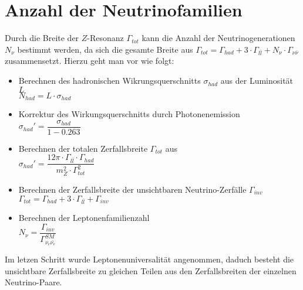 \documentclass{include/thesisclass3}
\newcommand{\cc}{\cdot}
\begin{document}
\section{Anzahl der Neutrinofamilien}
Durch die Breite der $Z$-Resonanz $\Gamma_{tot}$ kann die Anzahl der Neutrinogenerationen $N_\nu$ bestimmt werden, da sich die gesamte Breite aus $\Gamma_{tot} = \Gamma_{had} + 3 \cc \Gamma_{l \bar l} + N_\nu \cc \Gamma_{\nu \bar \nu}$ zusammensetzt. Hierzu geht man vor wie folgt:\\
\begin{itemize}
\item Berechnen des hadronischen Wikrungsquerschnitts $\sigma_{had}$ aus der Luminosität $L$\\
$N_{had}=L\cdot \sigma_{had}$

\item Korrektur des Wirkungsquerschnitts durch Photonenemission\\
$\sigma_{had}'=\dfrac{\sigma_{had}}{1-0.263} $

\item Berechnen der totalen Zerfallsbreite $\Gamma_{tot}$ aus\\
$\sigma_{had}'=\dfrac{12 \pi \cdot \Gamma_{l\bar{l}}\cdot \Gamma_{had}}{m_Z^2\cdot \Gamma_{tot}^2}$
\item Berechnen der Zerfallsbreite der unsichtbaren Neutrino-Zerfälle $\Gamma_{inv}$\\
$\Gamma_{tot} = \Gamma_{had} + 3 \cc \Gamma_{l \bar l} + \Gamma_{inv}$

\item  Berechnen der Leptonenfamilienzahl\\
$N_\nu=\dfrac{\Gamma_{inv}}{\Gamma_{\nu_e\bar{\nu_e}}^{SM}}$
\end{itemize}
Im letzen Schritt wurde Leptonenuniversalität angenommen, daduch besteht die unsichtbare Zerfallsbreite zu gleichen Teilen aus den Zerfallsbreiten der einzelnen Neutrino-Paare. 
\end{document}
